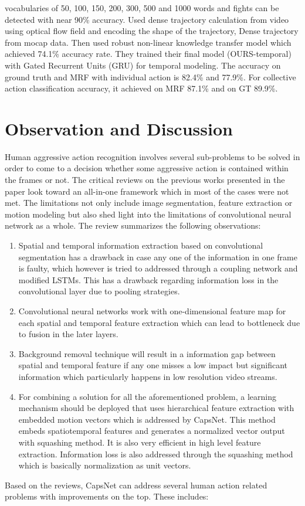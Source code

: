 \documentclass[11pt,english]{article}
\begin{document}
vocabularies of 50, 100, 150, 200, 300, 500 and 1000 words and fights can be detected with near 90\% accuracy. \citep{rahmani2018learning} Used dense trajectory calculation from video using optical flow field and encoding the shape of the trajectory, Dense trajectory from mocap data. Then used robust non-linear knowledge transfer model which achieved  74.1\% accuracy rate. \citep{bagautdinov2017social} They trained their final model (OURS-temporal) with Gated Recurrent Units (GRU) for temporal modeling. The accuracy on ground truth and MRF with individual action is 82.4\% and 77.9\%. For collective action classification accuracy, it achieved on MRF 87.1\% and on GT 89.9\%.
  

\section{Observation and Discussion}
Human aggressive action recognition involves several sub-problems to be solved in order to come to a decision whether some aggressive action is contained within the frames or not. The critical reviews on the previous works presented in the paper look toward an all-in-one framework which in most of the cases were not met. The limitations not only include image segmentation, feature extraction or motion modeling but also shed light into the limitations of convolutional neural network as a whole. The review summarizes the following observations: 

\begin{enumerate}
\item Spatial and temporal information extraction based on convolutional segmentation has a drawback in case any one of the information in one frame is faulty, which however is tried to addressed through a coupling network and modified LSTMs. This has a drawback regarding information loss in the convolutional layer due to pooling strategies.
\item Convolutional neural networks work with one-dimensional feature map for each spatial and temporal feature extraction which can lead to bottleneck due to fusion in the later layers.
\item Background removal technique will result in a information gap between spatial and temporal feature if any one misses a low impact but significant information which particularly happens in low resolution video streams.
\item For combining a solution for all the aforementioned problem, a learning mechanism should be deployed that uses hierarchical feature extraction with embedded motion vectors which is addressed by CapsNet\citep{sabour2017dynamic}. This method embeds spatiotemporal features and generates a normalized vector output with squashing method. It is also very efficient in high level feature extraction. Information loss is also addressed through the squashing method which is basically normalization as unit vectors.
\end{enumerate}
Based on the reviews, CapsNet can address several human action related problems with improvements on the top. These includes:
\end{document}
